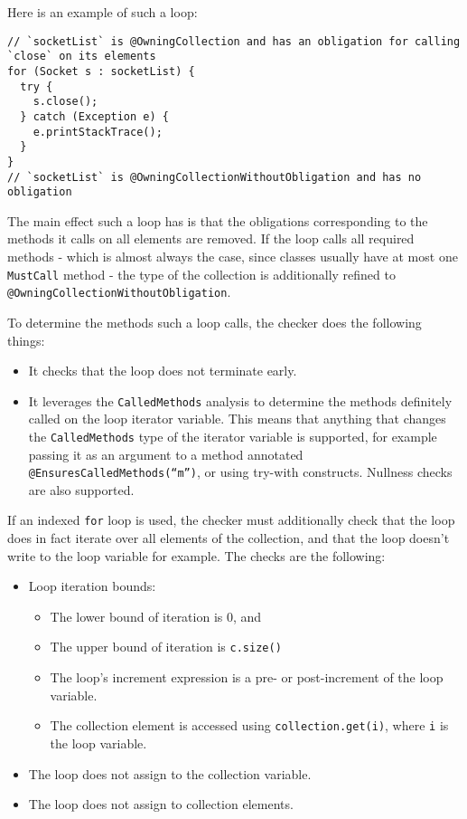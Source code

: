 Here is an example of such a loop:

\begin{verbatim}
// `socketList` is @OwningCollection and has an obligation for calling `close` on its elements
for (Socket s : socketList) {
  try {
    s.close();
  } catch (Exception e) {
    e.printStackTrace();
  }
}
// `socketList` is @OwningCollectionWithoutObligation and has no obligation
\end{verbatim}

The main effect such a loop has is that the obligations corresponding to the methods it calls on all elements are removed. If the loop calls all required methods - which is almost always the case, since classes usually have at most one \texttt{MustCall} method - the type of the collection is additionally refined to \texttt{@OwningCollectionWithoutObligation}.

To determine the methods such a loop calls, the checker does the following things:

\begin{itemize}
  \item It checks that the loop does not terminate early.
  \item It leverages the \texttt{CalledMethods} analysis to determine the methods definitely called on the loop iterator variable. This means that anything that changes the \texttt{CalledMethods} type of the iterator variable is supported, for example passing it as an argument to a method annotated \texttt{@EnsuresCalledMethods(``m'')}, or using try-with constructs. Nullness checks are also supported.
\end{itemize}

If an indexed \texttt{for} loop is used, the checker must additionally check that the loop does in fact iterate over all elements of the collection, and that the loop doesn't write to the loop variable for example. The checks are the following:

\begin{itemize}
  \item Loop iteration bounds:
    \begin{itemize}
      \item The lower bound of iteration is 0, and
      \item The upper bound of iteration is \texttt{c.size()}
      \item The loop's increment expression is a pre- or post-increment of the loop variable.
      \item The collection element is accessed using \texttt{collection.get(i)}, where \texttt{i} is the loop variable.
    \end{itemize}
  \item The loop does not assign to the collection variable.
  \item The loop does not assign to collection elements.
\end{itemize}

